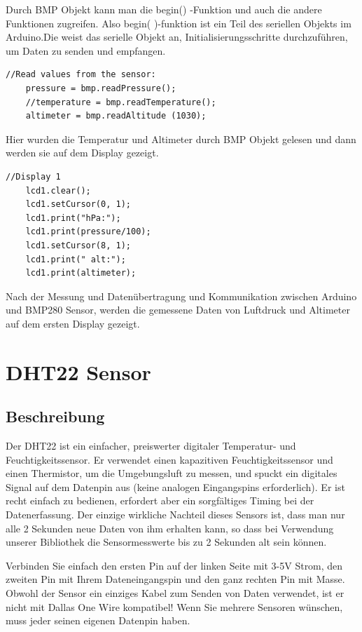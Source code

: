 \documentclass[conference]{IEEEtran}
\begin{document}
Durch BMP Objekt kann man die begin() -Funktion und auch die andere Funktionen zugreifen. Also begin( )-funktion ist ein Teil des seriellen Objekts im Arduino.Die  weist das serielle Objekt an, Initialisierungsschritte durchzuführen, um Daten zu senden und empfangen.

\begin{lstlisting}[style=CStyle]
	//Read values from the sensor:
	pressure = bmp.readPressure();
	//temperature = bmp.readTemperature();
	altimeter = bmp.readAltitude (1030);
\end{lstlisting}

Hier wurden die Temperatur und Altimeter durch BMP Objekt gelesen und dann werden sie auf dem Display gezeigt. 

\begin{lstlisting}[style=CStyle]
	//Display 1
	lcd1.clear();
	lcd1.setCursor(0, 1);
	lcd1.print("hPa:");
	lcd1.print(pressure/100); 
	lcd1.setCursor(8, 1);
	lcd1.print(" alt:");
	lcd1.print(altimeter);
\end{lstlisting}

Nach der Messung und Datenübertragung und Kommunikation zwischen Arduino und BMP280 Sensor, werden die gemessene Daten von Luftdruck und Altimeter auf dem ersten Display gezeigt. 

\section{DHT22 Sensor}

\subsection{Beschreibung}
Der DHT22 ist ein einfacher, preiswerter digitaler Temperatur- und Feuchtigkeitssensor. Er verwendet einen kapazitiven Feuchtigkeitssensor und einen Thermistor, um die Umgebungsluft zu messen, und spuckt ein digitales Signal auf dem Datenpin aus (keine analogen Eingangspins erforderlich). Er ist recht einfach zu bedienen, erfordert aber ein sorgfältiges Timing bei der Datenerfassung. Der einzige wirkliche Nachteil dieses Sensors ist, dass man nur alle 2 Sekunden neue Daten von ihm erhalten kann, so dass bei Verwendung unserer Bibliothek die Sensormesswerte bis zu 2 Sekunden alt sein können.

Verbinden Sie einfach den ersten Pin auf der linken Seite mit 3-5V Strom, den zweiten Pin mit Ihrem Dateneingangspin und den ganz rechten Pin mit Masse. Obwohl der Sensor ein einziges Kabel zum Senden von Daten verwendet, ist er nicht mit Dallas One Wire kompatibel! Wenn Sie mehrere Sensoren wünschen, muss jeder seinen eigenen Datenpin haben.
\end{document}
